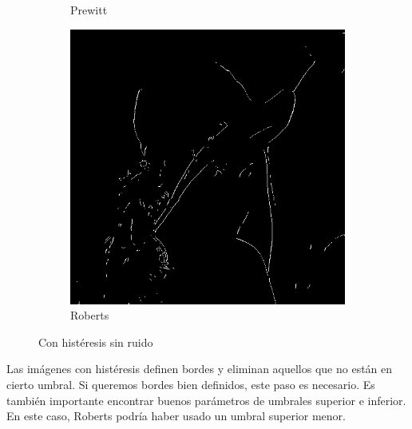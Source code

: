 \documentclass[a4paper]{article}
\begin{document}
\begin{figure}[H]
\begin{subfigure}[t]{0.3\textwidth}
	\caption{Prewitt}
	\end{subfigure}
	\begin{subfigure}[t]{0.3\textwidth}
	\centering
	\includegraphics[width=\textwidth]{imagenesInforme/lenaHysteresisRoberts}
	\caption{Roberts}
	\end{subfigure}
\caption{Con histéresis sin ruido}
\end{figure}

Las imágenes con histéresis definen bordes y eliminan aquellos que no están en cierto umbral. Si queremos bordes bien definidos, este paso es necesario. Es también importante encontrar buenos parámetros de umbrales superior e inferior. En este caso, Roberts podría haber usado un umbral superior menor.
\end{document}

